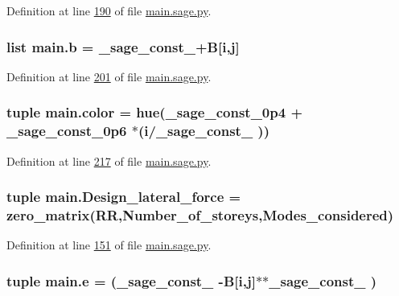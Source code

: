 Definition at line \hyperlink{main_8sage_8py_source_l00190}{190} of file \hyperlink{main_8sage_8py_source}{main.\+sage.\+py}.

\hypertarget{namespacemain_ab1e783015bffd2e1d395a9099143d967}{}
\subsubsection[{b}]{\setlength{\rightskip}{0pt plus 5cm}list main.\+b = \+\_\+sage\+\_\+const\+\_+{\bf B}\mbox{[}{\bf i},{\bf j}\mbox{]}}\label{namespacemain_ab1e783015bffd2e1d395a9099143d967}


Definition at line \hyperlink{main_8sage_8py_source_l00201}{201} of file \hyperlink{main_8sage_8py_source}{main.\+sage.\+py}.

\hypertarget{namespacemain_aeabbf69db1809807f065c2d1e9a62567}{}
\subsubsection[{color}]{\setlength{\rightskip}{0pt plus 5cm}tuple main.\+color = hue(\+\_\+sage\+\_\+const\+\_\+0p4 + \+\_\+sage\+\_\+const\+\_\+0p6 $\ast$({\bf i}/\+\_\+sage\+\_\+const\+\_ ))}\label{namespacemain_aeabbf69db1809807f065c2d1e9a62567}


Definition at line \hyperlink{main_8sage_8py_source_l00217}{217} of file \hyperlink{main_8sage_8py_source}{main.\+sage.\+py}.

\hypertarget{namespacemain_a0caf610899fee63b00acb7cce7c804d7}{}
\subsubsection[{Design\+\_\+lateral\+\_\+force}]{\setlength{\rightskip}{0pt plus 5cm}tuple main.\+Design\+\_\+lateral\+\_\+force = zero\+\_\+matrix(R\+R,Number\+\_\+of\+\_\+storeys,{\bf Modes\+\_\+considered})}\label{namespacemain_a0caf610899fee63b00acb7cce7c804d7}


Definition at line \hyperlink{main_8sage_8py_source_l00151}{151} of file \hyperlink{main_8sage_8py_source}{main.\+sage.\+py}.

\hypertarget{namespacemain_aa7f4fe671f919f7f067f9337ef9e02c0}{}
\subsubsection[{e}]{\setlength{\rightskip}{0pt plus 5cm}tuple main.\+e = (\+\_\+sage\+\_\+const\+\_ -\/{\bf B}\mbox{[}{\bf i},{\bf j}\mbox{]}$\ast$$\ast${\bf \+\_\+sage\+\_\+const\+\_} )}\label{namespacemain_aa7f4fe671f919f7f067f9337ef9e02c0}


